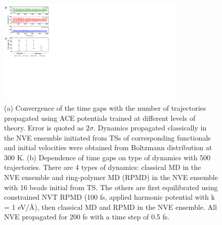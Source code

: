 \documentclass[twoside,twocolumn,9pt]{article}
\begin{document}
\begin{figure}[h]
	\centering
	\includegraphics[width=9cm]{figX4}
	\caption{(a) Convergence of the time gaps with the number of trajectories propagated using ACE potentials trained at different levels of theory. Error is quoted as $2\sigma$. Dynamics propagated classically in the NVE ensemble initiated from TSs of corresponding functionals and initial velocities were obtained from Boltzmann distribution at 300 K. (b) Dependence of time gaps on type of dynamics with 500 trajectories. There are 4 types of dynamics: classical MD in the NVE ensemble and ring-polymer MD (RPMD) in the NVE ensemble with 16 beads initial from TS. The others are first equilibrated using constrained NVT RPMD (100 fs, applied harmonic potential with k = 1 eV/Å), then classical MD and RPMD in the NVE ensemble. All NVE propagated for 200 fs with a time step of 0.5 fs.}
	\label{fig::X4}
\end{figure}
\end{document}

